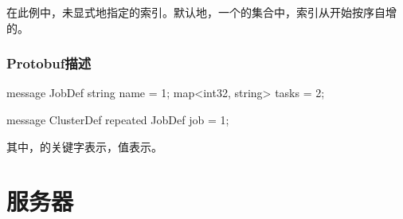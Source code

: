 \begin{content}
在此例中，未显式地指定的索引。默认地，一个的集合中，索引从开始按序自增的。

\subsubsection{Protobuf描述}

\begin{leftbar}
\begin{python}
message JobDef {
  string name = 1;
  map<int32, string> tasks = 2;
}

message ClusterDef {
  repeated JobDef job = 1;
}
\end{python}
\end{leftbar}

其中，的关键字表示，值表示。

\end{content}

\section{服务器}

